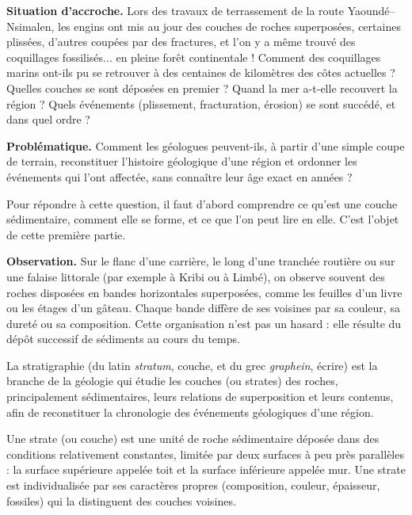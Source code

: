 \documentclass[11pt]{article}
\newcommand{\cle}[1]{{\popxbold\color{popdark}#1}}
\newcounter{popsec}
\newcounter{popsub}
\newcommand{\courssub}[1]{%
  \stepcounter{popsub}%
  \par\vspace{9pt}\noindent{\popxbold\fontsize{11.5}{13}\selectfont\color{popink}{\color{poporange}\thepopsec.\thepopsub}\hspace{6pt}#1}\par\nopagebreak\vspace{4pt}
}
\begin{document}
\textbf{Situation d'accroche.} Lors des travaux de terrassement de la route Yaoundé--Nsimalen, les engins ont mis au jour des couches de roches superposées, certaines plissées, d'autres coupées par des fractures, et l'on y a même trouvé des coquillages fossilisés... en pleine forêt continentale ! Comment des coquillages marins ont-ils pu se retrouver à des centaines de kilomètres des côtes actuelles ? Quelles couches se sont déposées en premier ? Quand la mer a-t-elle recouvert la région ? Quels événements (plissement, fracturation, érosion) se sont succédé, et dans quel ordre ?

\textbf{Problématique.} Comment les géologues peuvent-ils, à partir d'une simple coupe de terrain, reconstituer l'histoire géologique d'une région et ordonner les événements qui l'ont affectée, sans connaître leur âge exact en années ?

Pour répondre à cette question, il faut d'abord comprendre ce qu'est une couche sédimentaire, comment elle se forme, et ce que l'on peut lire en elle. C'est l'objet de cette première partie.

\courssub{La stratigraphie : la science des couches}

\textbf{Observation.} Sur le flanc d'une carrière, le long d'une tranchée routière ou sur une falaise littorale (par exemple à Kribi ou à Limbé), on observe souvent des roches disposées en bandes horizontales superposées, comme les feuilles d'un livre ou les étages d'un gâteau. Chaque bande diffère de ses voisines par sa couleur, sa dureté ou sa composition. Cette organisation n'est pas un hasard : elle résulte du dépôt successif de sédiments au cours du temps.

\begin{definition}[Stratigraphie]
La \cle{stratigraphie} (du latin \emph{stratum}, couche, et du grec \emph{graphein}, écrire) est la branche de la géologie qui étudie les \cle{couches} (ou \cle{strates}) des roches, principalement sédimentaires, leurs relations de superposition et leurs contenus, afin de reconstituer la chronologie des événements géologiques d'une région.
\end{definition}

\begin{definition}
Une \cle{strate} (ou couche) est une unité de roche sédimentaire déposée dans des conditions relativement constantes, limitée par deux surfaces à peu près parallèles : la surface supérieure appelée \cle{toit} et la surface inférieure appelée \cle{mur}. Une strate est individualisée par ses caractères propres (composition, couleur, épaisseur, fossiles) qui la distinguent des couches voisines.
\end{definition}
\end{document}
